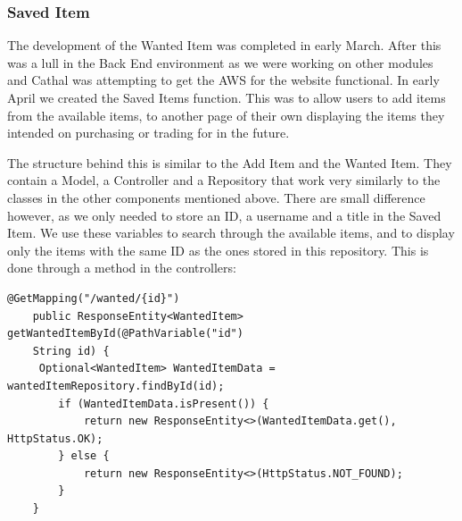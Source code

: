 \subsubsection{Saved Item}
The development of the Wanted Item was completed in early March. After this was a lull in the Back End environment as we were working on other modules and Cathal was attempting to get the AWS for the website functional. In early April we created the Saved Items function. This was to allow users to add items from the available items, to another page of their own displaying the items they intended on purchasing or trading for in the future. \par
The structure behind this is similar to the Add Item and the Wanted Item. They contain a Model, a Controller and a Repository that work very similarly to the classes in the other components mentioned above. There are small difference however, as we only needed to store an ID, a username and a title in the Saved Item. We use these variables to search through the available items, and to display only the items with the same ID as the ones stored in this repository. This is done through a method in the controllers: \par
\begin{verbatim}
@GetMapping("/wanted/{id}")
    public ResponseEntity<WantedItem> getWantedItemById(@PathVariable("id")
    String id) {
     Optional<WantedItem> WantedItemData = wantedItemRepository.findById(id);
        if (WantedItemData.isPresent()) {
            return new ResponseEntity<>(WantedItemData.get(), HttpStatus.OK);
        } else {
            return new ResponseEntity<>(HttpStatus.NOT_FOUND);
        }
    }
\end{verbatim}


